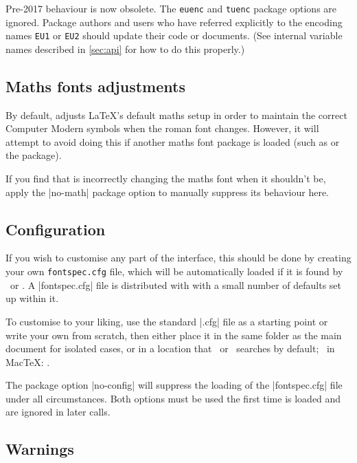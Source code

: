 \documentclass[a4paper]{l3doc}
\begin{document}
Pre-2017 behaviour is now obsolete. The \texttt{euenc} and \texttt{tuenc} package options are
ignored. Package authors and users who have referred explicitly to the encoding names \texttt{EU1} or \texttt{EU2} should update their code or documents.
(See internal variable names described in \vref{sec:api} for how to do this properly.)


\subsection{Maths fonts adjustments}
By default,  adjusts \LaTeX's default maths setup in order to maintain the correct Computer Modern symbols when the roman font changes.
However, it will attempt to avoid doing this if another maths font package is loaded (such as  or the  package).

If you find that  is incorrectly changing the maths font when it shouldn't be, apply the  |no-math| package option to manually suppress its behaviour here.


\subsection{Configuration}
\label{sec:config}

If you wish to customise any part of the
 interface, this should be done by creating your own
\texttt{fontspec.cfg} file,
which will be automatically loaded if it is found by \XeTeX\ or \LuaTeX.
A |fontspec.cfg| file is distributed with  with a small number of defaults set up within it.

To customise  to your liking, use the standard |.cfg| file as a starting point or write your own from scratch, then either place it in the same folder as the main document for isolated cases, or in a location
that \XeTeX\ or \LuaTeX\ searches by default; \eg\ in Mac\TeX: .

The package option |no-config| will suppress the loading of the |fontspec.cfg| file under all circumstances. Both options must be used the first time  is loaded and are ignored in later calls.


\subsection{Warnings}
\label{sec:quiet-warnings}
\end{document}

